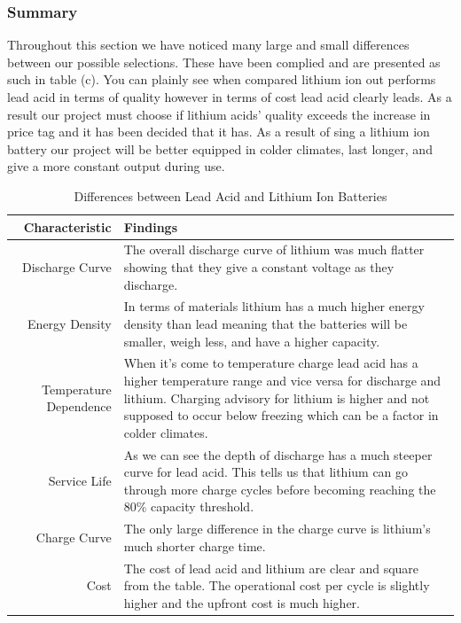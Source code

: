 \subsubsection{Summary}
Throughout this section we have noticed many large and small differences between our possible selections. These have been complied and are presented as such in table (c). You can plainly see when compared lithium ion out performs lead acid in terms of quality however in terms of cost lead acid clearly leads. As a result our project must choose if lithium acids' quality exceeds the increase in price tag and it has been decided that it has. As a result of sing a lithium ion battery our project will be better equipped in colder climates, last longer, and give a more constant output during use. 
\begin{table}
\centering\footnotesize
\caption{Differences between Lead Acid and Lithium Ion Batteries}
\begin{tabularx}{\linewidth}{|r|X|}
\hline
Characteristic & Findings \\\hline

Discharge Curve & The overall discharge curve of lithium was much flatter showing that they give a constant voltage as they discharge. 
  \\\hline
Energy Density & In terms of materials lithium has a much higher energy density than lead meaning that the batteries will be smaller, weigh less, and have a higher capacity. 
  \\\hline
Temperature Dependence & When it's come to temperature charge lead acid has a higher temperature range and vice versa for discharge and lithium. Charging advisory for lithium is higher and not supposed to occur below freezing which can be a factor in colder climates. 
  \\\hline
Service Life&As we can see the depth of discharge has a much steeper curve for lead acid. This tells us that lithium can go through more charge cycles before becoming reaching the 80\% capacity threshold. 
  \\\hline
Charge Curve&The only large difference in the charge curve is lithium's much shorter charge time. \\\hline
Cost&The cost of lead acid and lithium are clear and square from the table. The operational cost per cycle is slightly higher and the upfront cost is much higher.
  \\\hline
\end{tabularx}
\label{tab:battery-comparison}
\end{table}

